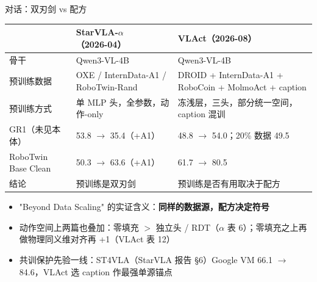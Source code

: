 \documentclass[aspectratio=169,10pt]{beamer}
\newcommand{\con}[1]{\textcolor{negative}{#1}}
\newcommand{\HL}[1]{\textcolor{emphasis}{#1}}
\begin{document}
\begin{frame}{对话：双刃剑 vs 配方}
  \begin{center}\footnotesize
  \begin{tabular}{p{2.3cm}p{4.6cm}p{6.4cm}}
    \toprule
     & StarVLA-$\alpha$（2026-04） & VLAct（2026-08） \\
    \midrule
    骨干 & Qwen3-VL-4B & Qwen3-VL-4B \\
    预训练数据 & OXE / InternData-A1 / RoboTwin-Rand & DROID + InternData-A1 + RoboCoin + MolmoAct + caption \\
    预训练方式 & 单 MLP 头，全参数，动作-only & 冻浅层，三头，部分统一空间，caption 混训 \\
    GR1（未见本体） & 53.8 $\to$ \con{35.4}（+A1） & 48.8 $\to$ \HL{54.0}；20\% 数据 49.5 \\
    RoboTwin Base Clean & 50.3 $\to$ 63.6（+A1） & 61.7 $\to$ 80.5 \\
    结论 & 预训练是双刃剑 & 预训练是否有用取决于配方 \\
    \bottomrule
  \end{tabular}
  \end{center}
  \vspace{6pt}
  \begin{itemize}
    \item "Beyond Data Scaling" 的实证含义：\textbf{同样的数据源，配方决定符号}
    \item 动作空间上两篇也叠加：零填充 $>$ 独立头 / RDT（$\alpha$ 表 6）；零填充之上再做物理同义维对齐再 +1（VLAct 表 12）
    \item 共训保护先验一线：ST4VLA（StarVLA 报告 §6）Google VM 66.1 $\to$ 84.6，VLAct 选 caption 作最强单源锚点
  \end{itemize}
\end{frame}
\end{document}
